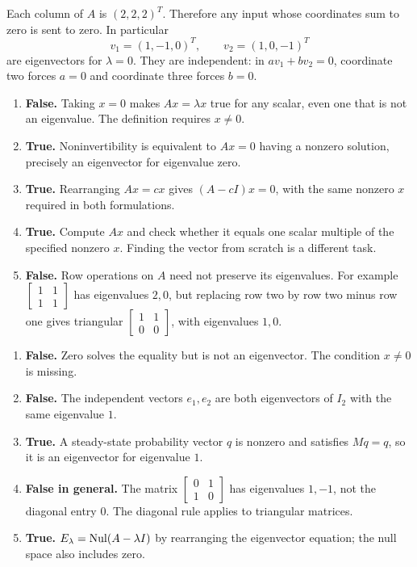 Each column of $A$ is $(2,2,2)^T$. Therefore any input whose
coordinates sum to zero is sent to zero. In particular
\[
 v_1=(1,-1,0)^T,\qquad v_2=(1,0,-1)^T
\]
are eigenvectors for $\lambda=0$. They are independent: in
$av_1+bv_2=0$, coordinate two forces $a=0$ and coordinate three
forces $b=0$.

\begin{enumerate}[label=(\alph*)]
\item \textbf{False.} Taking $x=0$ makes $Ax=\lambda x$ true for
any scalar, even one that is not an eigenvalue. The definition requires $x\ne0$.
\item \textbf{True.} Noninvertibility is equivalent to $Ax=0$ having
a nonzero solution, precisely an eigenvector for eigenvalue zero.
\item \textbf{True.} Rearranging $Ax=cx$ gives $(A-cI)x=0$,
with the same nonzero $x$ required in both formulations.
\item \textbf{True.} Compute $Ax$ and check whether it equals one
scalar multiple of the specified nonzero $x$. Finding the vector from
scratch is a different task.
\item \textbf{False.} Row operations on $A$ need not preserve its
eigenvalues. For example $\begin{bmatrix}1&1\\1&1\end{bmatrix}$ has
eigenvalues $2,0$, but replacing row two by row two minus row one
gives triangular $\begin{bmatrix}1&1\\0&0\end{bmatrix}$, with eigenvalues $1,0$.
\end{enumerate}

\begin{enumerate}[label=(\alph*)]
\item \textbf{False.} Zero solves the equality but is not an eigenvector.
The condition $x\ne0$ is missing.
\item \textbf{False.} The independent vectors $e_1,e_2$ are both
eigenvectors of $I_2$ with the same eigenvalue $1$.
\item \textbf{True.} A steady-state probability vector $q$ is nonzero
and satisfies $Mq=q$, so it is an eigenvector for eigenvalue $1$.
\item \textbf{False in general.} The matrix
$\begin{bmatrix}0&1\\1&0\end{bmatrix}$ has eigenvalues $1,-1$,
not the diagonal entry $0$. The diagonal rule applies to triangular matrices.
\item \textbf{True.} $E_\lambda=\operatorname{Nul}(A-\lambda I)$ by rearranging
the eigenvector equation; the null space also includes zero.
\end{enumerate}

